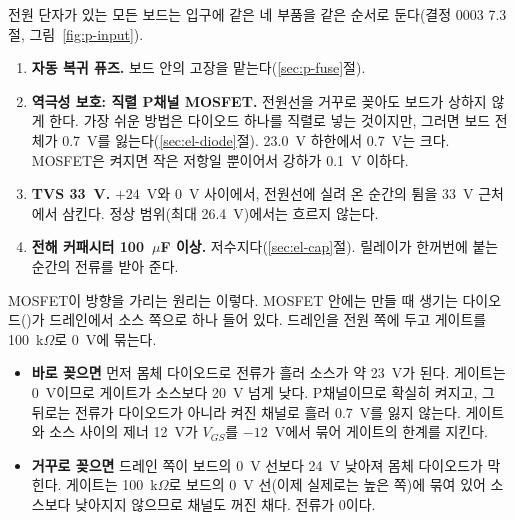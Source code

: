 \Why 전원 단자가 있는 모든 보드는 입구에 같은 네 부품을 같은 순서로 둔다(결정 0003 7.3절, 그림~\ref{fig:p-input}).
\begin{enumerate}
\item \textbf{자동 복귀 퓨즈.} 보드 안의 고장을 맡는다(\ref{sec:p-fuse}절).
\item \textbf{역극성 보호: 직렬 P채널 MOSFET.} 전원선을 거꾸로 꽂아도 보드가 상하지 않게 한다. 가장 쉬운 방법은 다이오드
하나를 직렬로 넣는 것이지만, 그러면 보드 전체가 0.7~V를 잃는다(\ref{sec:el-diode}절). 23.0~V 하한에서 0.7~V는 크다. MOSFET은
켜지면 작은 저항일 뿐이어서 강하가 0.1~V 이하다.
\item \textbf{TVS 33~V.} $+24$~V와 0~V 사이에서, 전원선에 실려 온 순간의 튐을 33~V 근처에서 삼킨다. 정상 범위(최대 26.4~V)에서는
흐르지 않는다.
\item \textbf{전해 커패시터 100~$\mu$F 이상.} 저수지다(\ref{sec:el-cap}절). 릴레이가 한꺼번에 붙는 순간의 전류를 받아 준다.
\end{enumerate}

MOSFET이 방향을 가리는 원리는 이렇다. MOSFET 안에는 만들 때 생기는 다이오드()가 드레인에서
소스 쪽으로 하나 들어 있다. 드레인을 전원 쪽에 두고 게이트를 100~k$\Omega$로 0~V에 묶는다.
\begin{itemize}
\item \textbf{바로 꽂으면} 먼저 몸체 다이오드로 전류가 흘러 소스가 약 23~V가 된다. 게이트는 0~V이므로 게이트가 소스보다 20~V
넘게 낮다. P채널이므로 확실히 켜지고, 그 뒤로는 전류가 다이오드가 아니라 켜진 채널로 흘러 0.7~V를 잃지 않는다. 게이트와
소스 사이의 제너 12~V가 $V_{GS}$를 $-12$~V에서 묶어 게이트의 한계를 지킨다.
\item \textbf{거꾸로 꽂으면} 드레인 쪽이 보드의 0~V 선보다 24~V 낮아져 몸체 다이오드가 막힌다. 게이트는 100~k$\Omega$로 보드의
0~V 선(이제 실제로는 높은 쪽)에 묶여 있어 소스보다 낮아지지 않으므로 채널도 꺼진 채다. 전류가 0이다.
\end{itemize}

